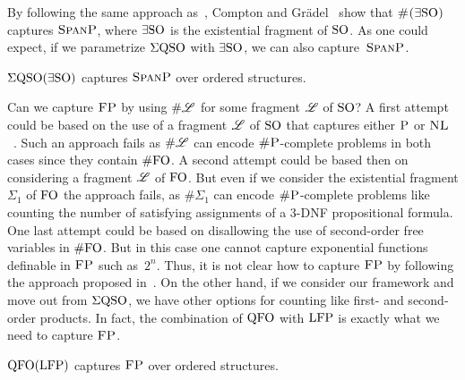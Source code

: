 By following the same approach as~\cite{SalujaST95}, Compton and Gr\"adel~\cite{ComptonG96} show that $\text{\sc \#($\exists{\rm SO}$)}$ captures $\text{\sc SpanP}$, where $\exists{\rm SO}$ is the existential fragment of ${\rm SO}$. As one could expect, if we parametrize $\Sigma{\rm QSO}$ with $\exists{\rm SO}$, we can also capture~$\text{\sc SpanP}$.
\begin{proposition} \label{prop:capture-spanP}
	$\Sigma{\rm QSO}(\exists{\rm SO})$ captures $\text{\sc SpanP}$ over ordered structures.
\end{proposition}
Can we capture $\text{\sc FP}$ by using $\# \mathscr{L}$ for some fragment $\mathscr{L}$ of ${\rm SO}$? A first attempt could be based on the use of a fragment $\mathscr{L}$ of ${\rm SO}$ that captures either $\text{\sc P}$ or $\text{\sc NL}$~\cite{G92}. Such an approach fails as $\# \mathscr{L}$ can encode $\text{\sc \#P}$-complete problems in both cases since they contain $\#{\rm FO}$.
A second attempt could be based then on considering a fragment $\mathscr{L}$ of ${\rm FO}$. 
But even if we consider the existential fragment $\Sigma_1$ of ${\rm FO}$ the approach fails, as $\# \Sigma_1$ can encode $\text{\sc \#P}$-complete problems like counting the number of satisfying assignments of a 3-DNF propositional formula\cite{SalujaST95}. One last attempt could be based on disallowing the use of second-order free variables in $\#{\rm FO}$. But in this case one 
cannot capture exponential functions definable in $\text{\sc FP}$ such as~$2^n$.
Thus, it is not  clear how to capture
$\text{\sc FP}$ 
by following the approach proposed in~\cite{SalujaST95}. 
On the other hand, if we consider our framework and move out from $\Sigma{\rm QSO}$, we have other options for counting like first- and second-order products. In fact, the combination of ${\rm QFO}$ with ${\rm LFP}$ is exactly what we need to capture $\text{\sc FP}$.
\begin{theorem} \label{theo:capture-fp}
	${\rm QFO}({\rm LFP})$ captures $\text{\sc FP}$ over ordered structures.
\end{theorem}

